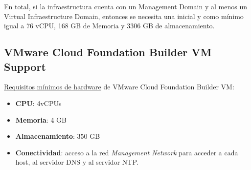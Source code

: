 En total, si la infraestructura cuenta con un Management Domain y al menos un Virtual Infraestructure Domain, entonces se necesita una  inicial y como mínimo igual a 76 vCPU, 168 GB de Memoria y 3306 GB de almacenamiento.

\subsection{VMware Cloud Foundation Builder VM Support}
\underline{Requisitos mínimos de hardware} de VMware Cloud Foundation Builder VM:
\begin{itemize}
    \item \textbf{CPU}: 4vCPUs
    \item \textbf{Memoria}: 4 GB
    \item \textbf{Almacenamiento}: 350 GB
    \item \textbf{Conectividad}: acceso a la red \textit{Management Network} para acceder a cada host, al servidor DNS y al servidor NTP.
\end{itemize}
